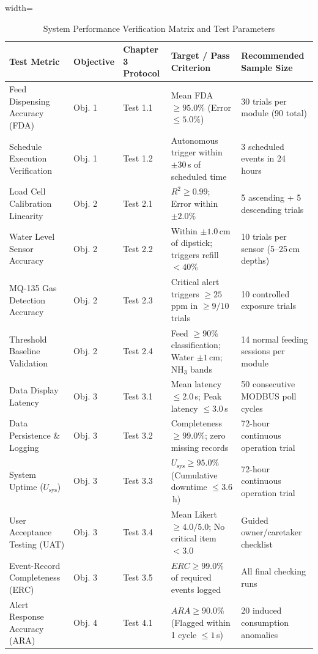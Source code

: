 \begin{table}[htbp!]
\centering
\caption{System Performance Verification Matrix and Test Parameters}
\label{tab:master_testing_matrix}
\begin{adjustbox}{width=\textwidth}
\begin{tabular}{lllll}
\toprule
\textbf{Test Metric} & \textbf{Objective} & \textbf{Chapter 3 Protocol} & \textbf{Target / Pass Criterion} & \textbf{Recommended Sample Size} \\
\midrule
Feed Dispensing Accuracy (FDA) & Obj. 1 & Test 1.1 & Mean FDA $\ge 95.0\%$ (Error $\le 5.0\%$) & 30 trials per module (90 total) \\
Schedule Execution Verification & Obj. 1 & Test 1.2 & Autonomous trigger within $\pm 30$\,s of scheduled time & 3 scheduled events in 24 hours \\
Load Cell Calibration Linearity & Obj. 2 & Test 2.1 & $R^2 \ge 0.99$; Error within $\pm 2.0\%$ & 5 ascending + 5 descending trials \\
Water Level Sensor Accuracy & Obj. 2 & Test 2.2 & Within $\pm 1.0$\,cm of dipstick; triggers refill $< 40\%$ & 10 trials per sensor (5--25\,cm depths) \\
MQ-135 Gas Detection Accuracy & Obj. 2 & Test 2.3 & Critical alert triggers $\ge 25$\,ppm in $\ge 9/10$ trials & 10 controlled exposure trials \\
Threshold Baseline Validation & Obj. 2 & Test 2.4 & Feed $\ge 90\%$ classification; Water $\pm 1$\,cm; NH$_3$ bands & 14 normal feeding sessions per module \\
Data Display Latency & Obj. 3 & Test 3.1 & Mean latency $\le 2.0$\,s; Peak latency $\le 3.0$\,s & 50 consecutive MODBUS poll cycles \\
Data Persistence \& Logging & Obj. 3 & Test 3.2 & Completeness $\ge 99.0\%$; zero missing records & 72-hour continuous operation trial \\
System Uptime ($U_{\text{sys}}$) & Obj. 3 & Test 3.3 & $U_{\text{sys}} \ge 95.0\%$ (Cumulative downtime $\le 3.6$\,h) & 72-hour continuous operation trial \\
User Acceptance Testing (UAT) & Obj. 3 & Test 3.4 & Mean Likert $\ge 4.0 / 5.0$; No critical item $< 3.0$ & Guided owner/caretaker checklist \\
Event-Record Completeness (ERC) & Obj. 3 & Test 3.5 & $ERC \ge 99.0\%$ of required events logged & All final checking runs \\
Alert Response Accuracy (ARA) & Obj. 4 & Test 4.1 & $ARA \ge 90.0\%$ (Flagged within 1 cycle $\le 1$\,s) & 20 induced consumption anomalies \\

\end{tabular}
\end{adjustbox}
\end{table}
